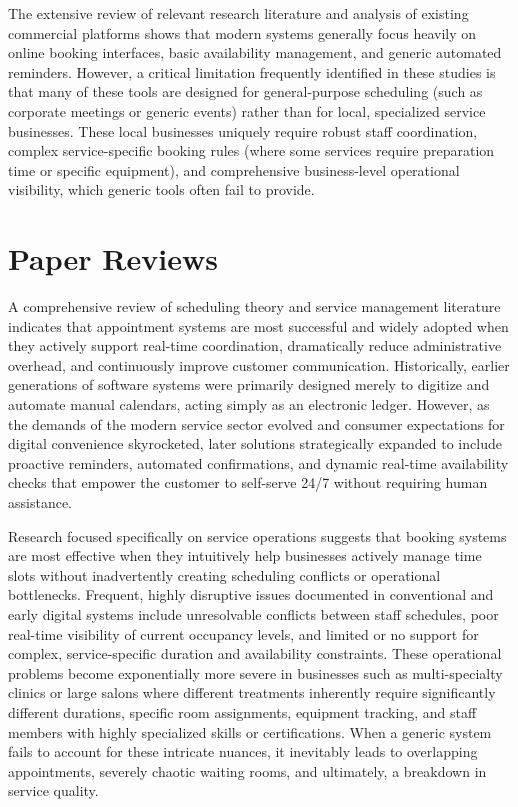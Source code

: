 The extensive review of relevant research literature and analysis of existing commercial platforms shows that modern systems generally focus heavily on online booking interfaces, basic availability management, and generic automated reminders. However, a critical limitation frequently identified in these studies is that many of these tools are designed for general-purpose scheduling (such as corporate meetings or generic events) rather than for local, specialized service businesses. These local businesses uniquely require robust staff coordination, complex service-specific booking rules (where some services require preparation time or specific equipment), and comprehensive business-level operational visibility, which generic tools often fail to provide.

\section{Paper Reviews}
A comprehensive review of scheduling theory and service management literature indicates that appointment systems are most successful and widely adopted when they actively support real-time coordination, dramatically reduce administrative overhead, and continuously improve customer communication. Historically, earlier generations of software systems were primarily designed merely to digitize and automate manual calendars, acting simply as an electronic ledger. However, as the demands of the modern service sector evolved and consumer expectations for digital convenience skyrocketed, later solutions strategically expanded to include proactive reminders, automated confirmations, and dynamic real-time availability checks that empower the customer to self-serve 24/7 without requiring human assistance.

Research focused specifically on service operations suggests that booking systems are most effective when they intuitively help businesses actively manage time slots without inadvertently creating scheduling conflicts or operational bottlenecks. Frequent, highly disruptive issues documented in conventional and early digital systems include unresolvable conflicts between staff schedules, poor real-time visibility of current occupancy levels, and limited or no support for complex, service-specific duration and availability constraints. These operational problems become exponentially more severe in businesses such as multi-specialty clinics or large salons where different treatments inherently require significantly different durations, specific room assignments, equipment tracking, and staff members with highly specialized skills or certifications. When a generic system fails to account for these intricate nuances, it inevitably leads to overlapping appointments, severely chaotic waiting rooms, and ultimately, a breakdown in service quality.

